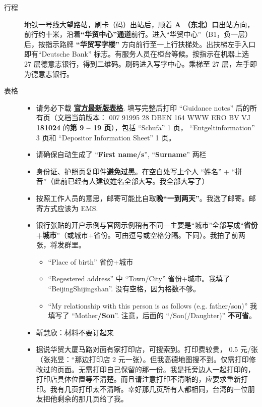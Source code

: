 \documentclass{article}
\begin{document}
\begin{description}
\item[行程] 地铁一号线大望路站，刷卡（码）出站后，顺着 \textbf{\color{blue}A （东北）口}出站方向，前行约十米，沿着\textbf{\color{blue}“华贸中心”通道}前行。进入“华贸中心”（B1，负一层）后，按指示路牌 \textbf{\color{blue}“华贸写字楼”} 方向前行至一上行扶梯处。出扶梯左手入口即有``Deutsche Bank'' 标志。有服务人员在柜台等候。按指示在机器上选 27 层德意志银行，得到二维码。刷码进入写字中心。乘梯至 27 层，左手即为德意志银行。
\item[表格]
\begin{itemize}
  \item 请务必下载 \href{https://china.db.com/china/docs/1.opening\_a\_bank\_account\_for\_foreign\_students\_over18years.pdf}{\textbf{\color{blue}官方最新版表格}}. 填写完整后打印 ``Guidance notes'' 后的所有页（文档当前版本：
  007 91995 28 DBEN 164 WWW ERO BV VJ \textbf{\color{blue}181024} 的\textbf{\color{blue}第 9 -- 19 页}），包括 ``Schufa'' 1 页， ``Entgeltinformation'' 3 页和 ``Depositor Information Sheet'' 1 页。 
  \item 请确保自动生成了 ``\textbf{\color{blue}First name/s}'', ``\textbf{\color{blue}Surname}'' 两栏
  \item 身份证、护照页复印件\textbf{避免过黑}。在空白处写上个人 “姓名” + “拼音”（此前已经有人建议姓名全部大写。我全部大写了）
  \item 按照工作人员的意思，邮寄可能比自取\textbf{\color{blue}晚“一到两天”}。我选了邮寄。邮寄方式应该为 EMS.
  \item 银行张贴的开户示例与官网示例稍有不同---主要是“城市”全部写成“\textbf{\color{blue}省份+城市}”（或城市+省份。可由逗号或空格分隔。下同）。我拍了前两张，将发群里。
  \begin{itemize}
    \item ``Place of birth'' 省份+城市
    \item ``Regestered address'' 中 ``Town/City'' 省份+城市。我填了 ``BeijingShijingshan''. 没有空格，因为格数不够。
    \item ``My relationship with this person is as follows (e.g. father/son)'' 我填写了 ``Mother\textbf{\color{blue}/Son}''. 注意，后面的 ``/Son(/Daughter)'' \textbf{\color{blue}不可省}。
  \end{itemize}
\item 靳慧欣：材料不要订起来
\item 据说华贸大厦马路对面有家打印店，可搜索到。打印费较贵， 0.5 元/张（张兆昱：“那边打印店 2 元一张）。但我高德地图搜不到。仅需打印修改过的页面。{\color{blue}无需打印自己保留的那一份}。我是托旁边人一起打印的，打印店具体位置等不清楚。而且请注意{\color{blue}打印不清晰的，应要求重新打印}。我有几页打印太不清晰。幸好那几页所有人都相同，台湾的一位朋友把他剩余的那几页给了我。

\end{itemize}
\end{description}
\end{document}
